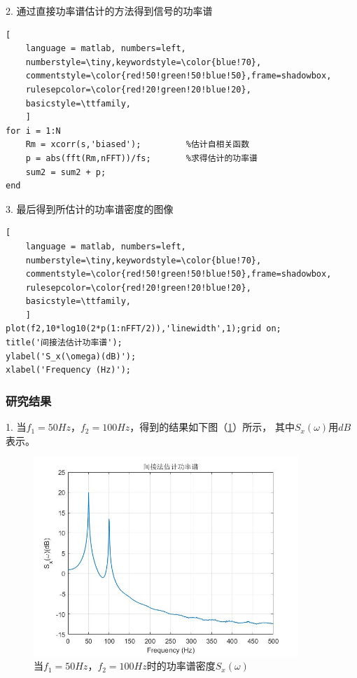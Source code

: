 \documentclass[UTF-8, a4paper, 12pt]{ctexart}
\begin{document}
2. 通过直接功率谱估计的方法得到信号的功率谱
\begin{lstlisting}[
	language = matlab, numbers=left, 
	numberstyle=\tiny,keywordstyle=\color{blue!70},
	commentstyle=\color{red!50!green!50!blue!50},frame=shadowbox,
	rulesepcolor=\color{red!20!green!20!blue!20},
	basicstyle=\ttfamily,
	]
for i = 1:N
    Rm = xcorr(s,'biased');         %估计自相关函数
    p = abs(fft(Rm,nFFT))/fs;       %求得估计的功率谱
    sum2 = sum2 + p;
end
\end{lstlisting}

3. 最后得到所估计的功率谱密度的图像
\begin{lstlisting}[
	language = matlab, numbers=left, 
	numberstyle=\tiny,keywordstyle=\color{blue!70},
	commentstyle=\color{red!50!green!50!blue!50},frame=shadowbox,
	rulesepcolor=\color{red!20!green!20!blue!20},
	basicstyle=\ttfamily,
	]
plot(f2,10*log10(2*p(1:nFFT/2)),'linewidth',1);grid on;
title('间接法估计功率谱');
ylabel('S_x(\omega)(dB)');
xlabel('Frequency (Hz)');
\end{lstlisting}
\subsubsection{研究结果}
1. 当$f_1=50Hz$，$ f_2=100Hz$，得到的结果如下图（\ref{f71}）所示，
其中$S_x(\omega)$用$dB$表示。
\begin{figure}[htbp]
    \centering
    \includegraphics[width=10cm]{figs/f71.jpg}
    \caption{当$f_1=50Hz$，$f_2=100Hz$时的功率谱密度$S_x(\omega)$}
    \label{f71}
\end{figure}\newpage
\end{document}
